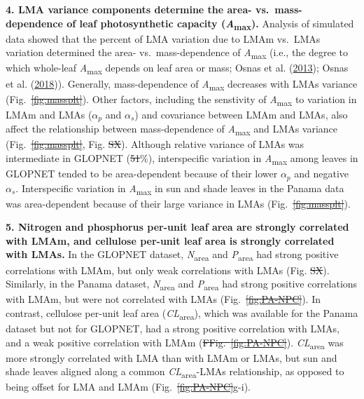 \documentclass[
  12pt,
  a4paper,
,tablecaptionabove
]{scrartcl}
\providecommand{\DIFaddtex}[1]{{\protect\color{blue}\uwave{#1}}} %
\providecommand{\DIFdeltex}[1]{{\protect\color{red}\sout{#1}}}                      %
\providecommand{\DIFaddbegin}{} %
\providecommand{\DIFaddend}{} %
\providecommand{\DIFdelbegin}{} %
\providecommand{\DIFdelend}{} %
\providecommand{\DIFadd}[1]{\texorpdfstring{\DIFaddtex{#1}}{#1}} %
\providecommand{\DIFdel}[1]{\texorpdfstring{\DIFdeltex{#1}}{}} %
\newcommand{\DIFscaledelfig}{0.5}
\newlength{\DIFdelgraphicswidth} %
\newlength{\DIFdelgraphicsheight} %
\newcommand{\DIFaddincludegraphics}[2][]{{\color{blue}\fbox{\DIFOincludegraphics[#1]{#2}}}} %
\newcommand{\DIFdelincludegraphics}[2][]{%
\sbox{\DIFdelgraphicsbox}{\DIFOincludegraphics[#1]{#2}}%
\settoboxwidth{\DIFdelgraphicswidth}{\DIFdelgraphicsbox} %
\settoboxtotalheight{\DIFdelgraphicsheight}{\DIFdelgraphicsbox} %
\scalebox{\DIFscaledelfig}{%
\parbox[b]{\DIFdelgraphicswidth}{\usebox{\DIFdelgraphicsbox}\\[-\baselineskip] \rule{\DIFdelgraphicswidth}{0em}}\llap{\resizebox{\DIFdelgraphicswidth}{\DIFdelgraphicsheight}{%
\setlength{\unitlength}{\DIFdelgraphicswidth}%
\begin{picture}(1,1)%
\thicklines\linethickness{2pt} %
{\color[rgb]{1,0,0}\put(0,0){\framebox(1,1){}}}%
{\color[rgb]{1,0,0}\put(0,0){\line( 1,1){1}}}%
{\color[rgb]{1,0,0}\put(0,1){\line(1,-1){1}}}%
\end{picture}%
}\hspace*{3pt}}} %
} %
\DeclareRobustCommand{\DIFaddbegin}{\DIFOaddbegin \let\includegraphics\DIFaddincludegraphics} %
\DeclareRobustCommand{\DIFaddend}{\DIFOaddend \let\includegraphics\DIFOincludegraphics} %
\DeclareRobustCommand{\DIFdelbegin}{\DIFOdelbegin \let\includegraphics\DIFdelincludegraphics} %
\DeclareRobustCommand{\DIFdelend}{\DIFOaddend \let\includegraphics\DIFOincludegraphics} %
\begin{document}
\textbf{4. LMA variance components determine the area-
vs.~mass-dependence of leaf photosynthetic capacity
(\emph{A}\textsubscript{max}).} Analysis of simulated data showed that
the percent of LMA variation due to LMAm vs.~LMAs variation determined
the area- vs.~mass-dependence of \emph{A}\textsubscript{max} (i.e., the
degree to which whole-leaf \emph{A}\textsubscript{max} depends on leaf
area or mass; Osnas et al. (\protect\hyperlink{ref-Osnas2013}{2013});
Osnas et al. (\protect\hyperlink{ref-Osnas2018}{2018})). Generally,
mass-dependence of \emph{A}\textsubscript{max} decreases with LMAs
variance (Fig.~\DIFdelbegin \DIFdel{\ref{fig:massplt}}\DIFdelend \DIFaddbegin \DIFadd{\ref{fig-massplt}}\DIFaddend ). Other factors, including the
senstivity of \emph{A}\textsubscript{max} to variation in LMAm and LMAs
(\(\alpha_p\) and \(\alpha_s\)) and covariance between LMAm and LMAs,
also affect the relationship between mass-dependence of
\emph{A}\textsubscript{max} and LMAs variance (Fig.~\DIFdelbegin \DIFdel{\ref{fig:massplt}}\DIFdelend \DIFaddbegin \DIFadd{\ref{fig-massplt}}\DIFaddend ,
Fig. \DIFdelbegin \DIFdel{SX}\DIFdelend \DIFaddbegin \DIFadd{S\ref{fig-mass_prop_sim}-\ref{fig-mass_prop_comp}}\DIFaddend ). Although
relative variance of LMAs was intermediate in GLOPNET (\DIFdelbegin \DIFdel{51}\DIFdelend \DIFaddbegin \DIFadd{51.6}\DIFaddend \%),
interspecific variation in \emph{A}\textsubscript{max} among leaves in
GLOPNET tended to be area-dependent because of their lower \(\alpha_p\)
and negative \(\alpha_s\). Interspecific variation in
\emph{A}\textsubscript{max} in sun and shade leaves in the Panama data
was area-dependent because of their large variance in LMAs
(Fig.~\DIFdelbegin \DIFdel{\ref{fig:massplt}}\DIFdelend \DIFaddbegin \DIFadd{\ref{fig-massplt}}\DIFaddend ).

\textbf{5. Nitrogen and phosphorus per-unit leaf area are strongly
correlated with LMAm, and cellulose per-unit leaf area is strongly
correlated with LMAs.} In the GLOPNET dataset,
\emph{N}\textsubscript{area} and \emph{P}\textsubscript{area} had strong
positive correlations with LMAm, but only weak correlations with LMAs
(Fig. \DIFdelbegin \DIFdel{SX}\DIFdelend \DIFaddbegin \DIFadd{S\ref{fig-glnp}}\DIFaddend ). Similarly, in the Panama dataset,
\emph{N}\textsubscript{area} and \emph{P}\textsubscript{area} had strong
positive correlations with LMAm, but were not correlated with LMAs
(Fig.~\DIFdelbegin \DIFdel{\ref{fig:PA-NPC}}\DIFdelend \DIFaddbegin \DIFadd{\ref{fig-PA-NPC}}\DIFaddend ). In contrast, cellulose per-unit leaf area
(\emph{CL}\textsubscript{area}), which was available for the Panama
dataset but not for GLOPNET, had a strong positive correlation with
LMAs, and a weak positive correlation with LMAm (\DIFdelbegin \DIFdel{FFig.~\ref{fig:PA-NPC}}\DIFdelend \DIFaddbegin \DIFadd{Fig.~\ref{fig-PA-NPC}}\DIFaddend ).
\emph{CL}\textsubscript{area} was more strongly correlated with LMA than
with LMAm or LMAs, but sun and shade leaves aligned along a common
\emph{CL}\textsubscript{area}-LMAs relationship, as opposed to being
offset for LMA and LMAm (Fig.~\DIFdelbegin \DIFdel{\ref{fig:PA-NPC}}\DIFdelend \DIFaddbegin \DIFadd{\ref{fig-PA-NPC}}\DIFaddend g-i).
\end{document}

